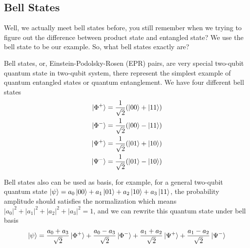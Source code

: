 \documentclass[11pt, letterpaper]{article}
\begin{document}
\subsection{Bell States}
Well, we actually meet bell states before, you still remember when we trying to figure out the difference between product state and entangled state? We use the bell state to be our example. So, what bell states exactly are?

Bell states, or, Einstein-Podolsky-Rosen (EPR) pairs, are very special two-qubit quantum state in two-qubit system, there represent the simplest example of quantum entangled states or quantum entanglement. We have four different bell states
\begin{equation}
  \begin{aligned}
    \ket{\Phi^+} &= \frac{1}{\sqrt{2}}(\ket{00} + \ket{11}) \\
    \ket{\Phi^-} &= \frac{1}{\sqrt{2}}(\ket{00} - \ket{11}) \\
    \ket{\Psi^+} &= \frac{1}{\sqrt{2}}(\ket{01} + \ket{10}) \\
    \ket{\Psi^-} &= \frac{1}{\sqrt{2}}(\ket{01} - \ket{10}) \\
  \end{aligned}
\end{equation}

Bell states also can be used as basis, for example, for a general two-qubit quantum state $\ket{\psi} = a_0\ket{00} + a_1\ket{01}+a_2\ket{10}+a_3\ket{11}$, the probability amplitude should satisfies the normalization which means $|a_0|^2+|a_1|^2+|a_2|^2+|a_3|^2 = 1$, and we can rewrite this quantum state under bell basis
\begin{equation}
  \ket{\psi} = \frac{a_0+a_3}{\sqrt{2}}\ket{\Phi^+} + \frac{a_0-a_3}{\sqrt{2}}\ket{\Phi^-} + \frac{a_1+a_2}{\sqrt{2}}\ket{\Psi^+} + \frac{a_1-a_2}{\sqrt{2}}\ket{\Psi^-}
\end{equation}
\end{document}
